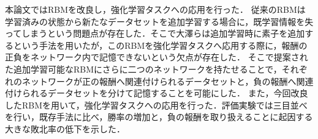\abstract

本論文ではRBMを改良し，強化学習タスクへの応用を行った．
従来のRBMは学習済みの状態から新たなデータセットを追加学習する場合に，既学習情報を失ってしまうという問題点が存在した．そこで大澤らは追加学習時に素子を追加するという手法を用いたが，このRBMを強化学習タスクへ応用する際に，報酬の正負をネットワーク内で記憶できないという欠点が存在した．
そこで提案された追加学習可能なRBMにさらに二つのネットワークを持たせることで，それぞれのネットワークが正の報酬へ関連付けられるデータセットと，負の報酬へ関連付けられるデータセットを分けて記憶することを可能にした．
また，今回改良したRBMを用いて，強化学習タスクへの応用を行った．評価実験では三目並べを行い，既存手法に比べ，勝率の増加と，負の報酬を取り扱えることに起因する大きな敗北率の低下を示した．
\cite{gregor2015draw}\cite{radford2015unsupervised}\cite{silver2016mastering}